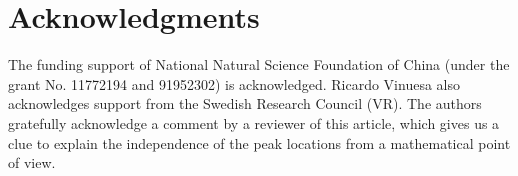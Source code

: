 %
%
%
%
%
%
%
%
%
%
%
%
%
\section*{Acknowledgments}  
The funding support of National Natural Science Foundation of China (under the grant No. 11772194 and 91952302) is acknowledged.  Ricardo Vinuesa also acknowledges support from the Swedish Research Council (VR). 
{\color{black}
The authors gratefully acknowledge a comment by a reviewer of this article, which gives us a clue to explain the independence of the peak locations from a mathematical point of view.}


